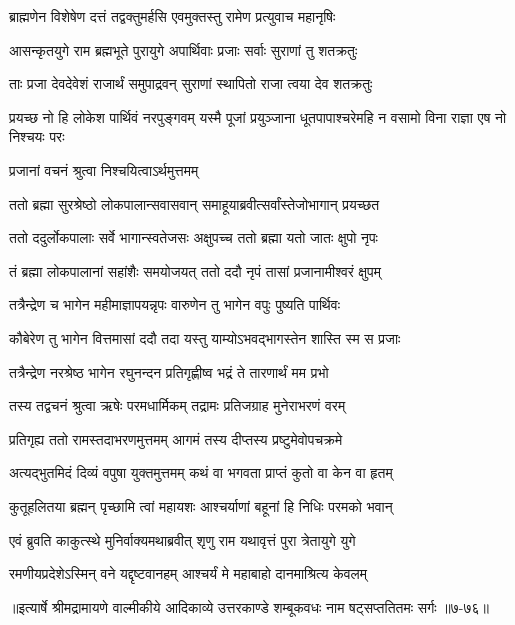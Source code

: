 \twolineshloka
{ब्राह्मणेन विशेषेण दत्तं तद्वक्तुमर्हसि}
{एवमुक्तस्तु रामेण प्रत्युवाच महानृषिः} %

\twolineshloka
{आसन्कृतयुगे राम ब्रह्मभूते पुरायुगे}
{अपार्थिवाः प्रजाः सर्वाः सुराणां तु शतक्रतुः} %

\twolineshloka
{ताः प्रजा देवदेवेशं राजार्थं समुपाद्रवन्}
{सुराणां स्थापितो राजा त्वया देव शतक्रतुः} %

\threelineshloka
{प्रयच्छ नो हि लोकेश पार्थिवं नरपुङ्गवम्}
{यस्मै पूजां प्रयुञ्जाना धूतपापाश्चरेमहि}
{न वसामो विना राज्ञा एष नो निश्चयः परः} %

\onelineshloka
{प्रजानां वचनं श्रुत्वा निश्चयित्वाऽर्थमुत्तमम्} %

\twolineshloka
{ततो ब्रह्मा सुरश्रेष्ठो लोकपालान्सवासवान्}
{समाहूयाब्रवीत्सर्वांस्तेजोभागान् प्रयच्छत} %

\twolineshloka
{ततो ददुर्लोकपालाः सर्वे भागान्स्वतेजसः}
{अक्षुपच्च ततो ब्रह्मा यतो जातः क्षुपो नृपः} %

\twolineshloka
{तं ब्रह्मा लोकपालानां सहांशैः समयोजयत्}
{ततो ददौ नृपं तासां प्रजानामीश्वरं क्षुपम्} %

\twolineshloka
{तत्रैन्द्रेण च भागेन महीमाज्ञापयन्नृपः}
{वारुणेन तु भागेन वपुः पुष्यति पार्थिवः} %

\twolineshloka
{कौबेरेण तु भागेन वित्तमासां ददौ तदा}
{यस्तु याम्योऽभवद्भागस्तेन शास्ति स्म स प्रजाः} %

\twolineshloka
{तत्रैन्द्रेण नरश्रेष्ठ भागेन रघुनन्दन}
{प्रतिगृह्णीष्व भद्रं ते तारणार्थं मम प्रभो} %

\twolineshloka
{तस्य तद्वचनं श्रुत्वा ऋषेः परमधार्मिकम्}
{तद्रामः प्रतिजग्राह मुनेराभरणं वरम्} %

\twolineshloka
{प्रतिगृह्य ततो रामस्तदाभरणमुत्तमम्}
{आगमं तस्य दीप्तस्य प्रष्टुमेवोपचक्रमे} %

\twolineshloka
{अत्यद्भुतमिदं दिव्यं वपुषा युक्तमुत्तमम्}
{कथं वा भगवता प्राप्तं कुतो वा केन वा हृतम्} %

\twolineshloka
{कुतूहलितया ब्रह्मन् पृच्छामि त्वां महायशः}
{आश्चर्याणां बहूनां हि निधिः परमको भवान्} %

\twolineshloka
{एवं ब्रुवति काकुत्स्थे मुनिर्वाक्यमथाब्रवीत्}
{शृणु राम यथावृत्तं पुरा त्रेतायुगे युगे} %

\twolineshloka
{रमणीयप्रदेशेऽस्मिन् वने यद्दृष्टवानहम्}
{आश्चर्यं मे महाबाहो दानमाश्रित्य केवलम्} %


॥इत्यार्षे श्रीमद्रामायणे वाल्मीकीये आदिकाव्ये उत्तरकाण्डे शम्बूकवधः नाम षट्सप्ततितमः सर्गः ॥७-७६॥
